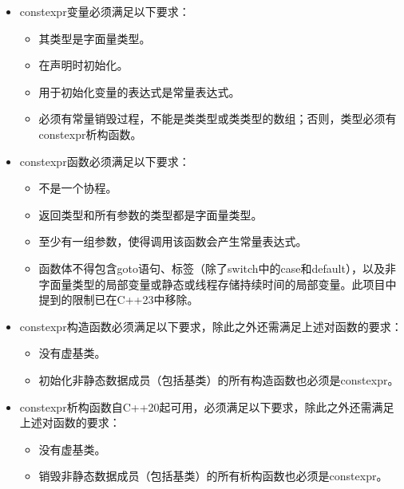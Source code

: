 \begin{itemize}
\item
constexpr变量必须满足以下要求：

\begin{itemize}
\item
其类型是字面量类型。

\item
在声明时初始化。

\item
用于初始化变量的表达式是常量表达式。

\item
必须有常量销毁过程，不能是类类型或类类型的数组；否则，类型必须有constexpr析构函数。
\end{itemize}

\item
constexpr函数必须满足以下要求：

\begin{itemize}
\item
不是一个协程。

\item
返回类型和所有参数的类型都是字面量类型。

\item
至少有一组参数，使得调用该函数会产生常量表达式。

\item
函数体不得包含goto语句、标签（除了switch中的case和default），以及非字面量类型的局部变量或静态或线程存储持续时间的局部变量。此项目中提到的限制已在C++23中移除。
\end{itemize}

\item
constexpr构造函数必须满足以下要求，除此之外还需满足上述对函数的要求：

\begin{itemize}
\item
没有虚基类。

\item
初始化非静态数据成员（包括基类）的所有构造函数也必须是constexpr。
\end{itemize}

\item
constexpr析构函数自C++20起可用，必须满足以下要求，除此之外还需满足上述对函数的要求：

\begin{itemize}
\item
没有虚基类。

\item
销毁非静态数据成员（包括基类）的所有析构函数也必须是constexpr。
\end{itemize}
\end{itemize}


